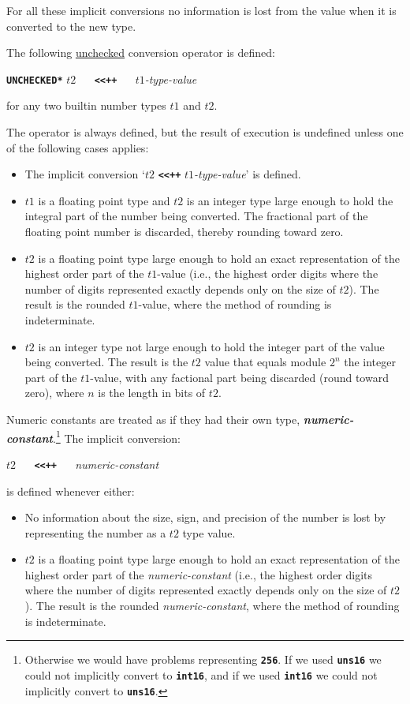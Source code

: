 \documentclass[12pt]{article}
\newcommand{\TT}[1]{{\tt \bfseries #1}}
\newcommand{\key}[1]{{\bf \em #1}\index{#1}}
\begin{document}
For all these implicit conversions no information is lost from
the value when it is converted to the new type.

The following \underline{unchecked}
conversion operator is defined:
\begin{center}

\TT{*UNCHECKED*} $t2$ ~~ \TT{<{}<++} ~~ $t1${\em -type-value}%
\label{<<**}

for any two builtin number types $t1$ and $t2$.

\end{center}

The operator is always defined, but the
result of execution is undefined unless one of the following
cases applies:
\begin{itemize}
\item The implicit conversion `$t2$ \TT{<{}<++} $t1${\em -type-value}'
is defined.
\item $t1$ is a floating point type
and $t2$ is an integer type large enough to hold the integral part
of the number being converted.  The fractional part of
the floating point number is discarded, thereby rounding toward
zero.
\item $t2$ is a floating point type large
enough to hold an exact representation of the highest order
part of the $t1$-value
(i.e., the highest order digits where the
number of digits represented exactly depends only on the size of $t2$).
The result is the rounded $t1$-value,
where the method of rounding is indeterminate.
\item $t2$ is an integer type not large enough
to hold the integer part of the value being converted.
The result is the $t2$ value that
equals module $2^n$ the integer part of the $t1$-value, with any
factional part being discarded (round toward zero),
where $n$ is the length in bits
of $t2$.
\end{itemize}

Numeric constants are treated as if they had their own type,
\key{numeric-constant}.\footnote{Otherwise we would have problems
representing \TT{256}.  If we used \TT{uns16} we could not implicitly
convert to \TT{int16}, and if we used \TT{int16} we could not implicitly
convert to \TT{uns16}.}
The implicit conversion:
\begin{center}
$t2$ ~~ \TT{<{}<++} ~~ {\em numeric-constant}
\end{center}
is defined whenever either:
\begin{itemize}
\item No information about the size, sign, and
precision of the number is lost by representing the number
as a $t2$ type value.
\item $t2$ is a floating point type large enough to hold an
exact representation of the highest order part of the
{\em numeric-constant}
(i.e., the highest order digits where the
number of digits represented exactly depends only on the size of $t2$).
The result is the rounded
{\em numeric-constant},
where the method of rounding is indeterminate.
\end{itemize}
\end{document}
